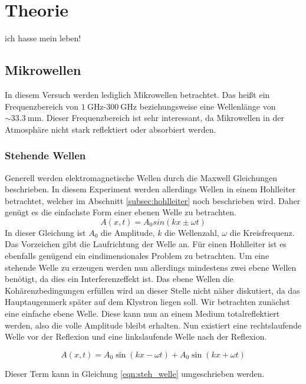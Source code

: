 \chapter{Theorie}
\label{cha:Theorie}
ich hasse mein leben!
\section{Mikrowellen}
\label{sec:mikrowellen}
In diesem Versuch werden lediglich Mikrowellen betrachtet. Das heißt ein Frequenzbereich von $\qty{1}{\giga\hertz}$-$\qty{300}{\giga\hertz}$ beziehungsweise eine Wellenlänge von 
$\sim \qty{33.3}{\milli\metre}$. Dieser Frequenzbereich ist sehr interessant, da Mikrowellen in der Atmosphäre nicht stark reflektiert oder absorbiert werden.
\subsection{Stehende Wellen}
\label{subsec:stehende_Welle}
Generell werden elektromagnetische Wellen durch die Maxwell Gleichungen beschrieben. In diesem Experiment werden allerdings Wellen in einem Hohlleiter betrachtet, welcher im Abschnitt 
\ref{subsec:hohlleiter} noch beschrieben wird. Daher genügt es die einfachste Form einer ebenen Welle zu betrachten.
\begin{equation*}
              A(x,t) = A_0sin(kx\pm\omega t)
\end{equation*}
In dieser Gleichung ist $A_0$ die Amplitude, $k$ die Wellenzahl, $\omega$ die Kreisfrequenz. Das Vorzeichen gibt die Laufrichtung der Welle an. Für einen Hohlleiter ist es ebenfalls 
genügend ein eindimensionales Problem zu betrachten. Um eine stehende Welle zu erzeugen werden nun allerdings mindestens zwei ebene Wellen benötigt, da dies ein Interferenzeffekt ist.
Das ebene Wellen die Kohärenzbedingungen erfüllen wird an dieser Stelle nicht näher diskutiert, da das Hauptaugenmerk später auf dem Klystron liegen soll. Wir betrachten zunächst eine
einfache ebene Welle. Diese kann nun an einem Medium totalreflektiert werden, also die volle Amplitude bleibt erhalten. Nun existiert eine rechtslaufende Welle vor der Reflexion und
eine linkslaufende Welle nach der Reflexion. 

\begin{equation*}
              A(x,t) = A_0\sin(kx - \omega t) + A_0\sin(kx + \omega t)
\end{equation*}

Dieser Term kann in Gleichung \ref{eqn:steh_welle} umgeschrieben werden.

